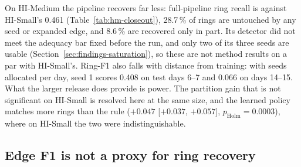 On HI-Medium the pipeline recovers far less: full-pipeline ring recall is
 against HI-Small's 0.461 (Table~\ref{tab:hm-closeout}), 28.7\,\% of rings
are untouched by any seed or expanded edge, and 8.6\,\% are recovered only in part. Its
detector did not meet the adequacy bar fixed before the run, and only two of its three seeds
are usable (Section~\ref{sec:findings-saturation}), so these are not method results on a par
with HI-Small's.
Ring-F1 also falls with distance from training: with seeds allocated per day, seed 1 scores
0.408 on test days 6--7 and 0.066 on days 14--15.
What the larger release does provide is power. The partition gain that is not significant on
HI-Small is resolved here at the same size, and the learned policy matches more rings than the
rule ($+0.047$ [$+0.037$, $+0.057$], $p_{\mathrm{Holm}}=0.0003$), where on HI-Small the two were
indistinguishable.



\subsection{Edge F1 is not a proxy for ring recovery}
\label{sec:results-swap}

